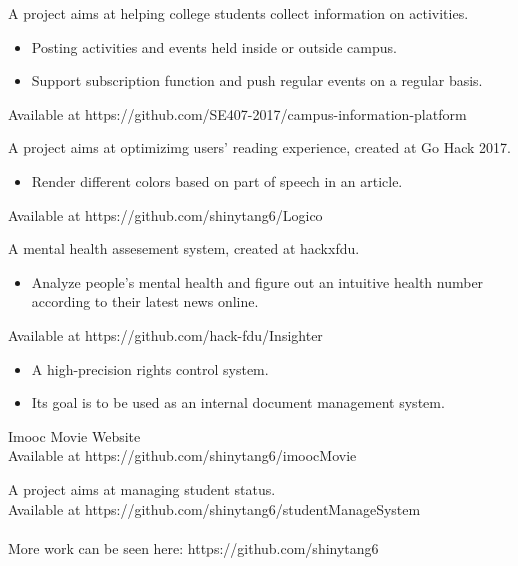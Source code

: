 \documentclass{resume}
\begin{document}
A project aims at helping college students collect information on activities.\begin{itemize}
  \item Posting activities and events held inside or outside campus.
  \item Support subscription function and push regular events on a regular basis.
\end{itemize}
Available at https://github.com/SE407-2017/campus-information-platform


A project aims at optimizimg users' reading experience, created at Go Hack 2017.
\begin{itemize}
  \item Render different colors based on part of speech in an article.
\end{itemize}
Available at https://github.com/shinytang6/Logico

A mental health assesement system, created at hackxfdu.
\begin{itemize}
  \item Analyze people's mental health and figure out an intuitive health number according to their latest news online.
\end{itemize}
Available at https://github.com/hack-fdu/Insighter


\begin{itemize}
  \item A high-precision rights control system. 
  \item Its goal is to be used as an internal document management system.
\end{itemize}


Imooc Movie Website\\
Available at https://github.com/shinytang6/imoocMovie


A project aims at managing student status.\\
Available at https://github.com/shinytang6/studentManageSystem
\\
\\
More work can be seen here: https://github.com/shinytang6
\end{document}
